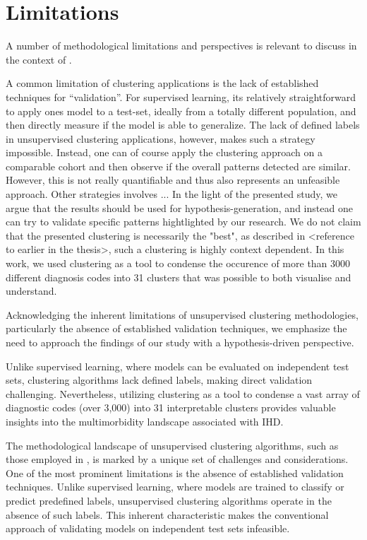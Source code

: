 \chapter{Limitations}

A number of methodological limitations and perspectives is 
relevant to discuss in the context of \studyi{}.

A common limitation of clustering applications is 
the lack of established techniques for \enquote{validation}.
For supervised learning, its relatively straightforward to 
apply ones model to a test-set, ideally from a totally different population,
and then directly measure if the model is able to generalize.
The lack of defined labels in unsupervised clustering applications, however,
makes such a strategy impossible.
Instead, one can of course apply the clustering approach on a comparable 
cohort and then observe if the overall patterns detected are similar.
However, this is not really quantifiable and thus also represents
an unfeasible approach.
Other strategies involves ...
In the light of the presented study,
we argue that the results should be used for hypothesis-generation,
and instead one can try to validate specific patterns hightlighted by our research.
We do not claim that the presented clustering is necessarily the "best",
as described in <reference to earlier in the thesis>, 
such a clustering is highly context dependent.
In this work, we used clustering as a tool to condense the occurence of more
than 3000 different diagnosis codes into 31 clusters that was possible to 
both visualise and understand.


Acknowledging the inherent limitations of unsupervised clustering
methodologies, particularly the absence of established validation techniques,
we emphasize the need to approach the findings of our study with a
hypothesis-driven perspective. 


Unlike supervised learning, where models can be
evaluated on independent test sets, clustering algorithms lack defined labels,
making direct validation challenging. Nevertheless, utilizing clustering as a
tool to condense a vast array of diagnostic codes (over 3,000) into 31
interpretable clusters provides valuable insights into the multimorbidity
landscape associated with \ac{IHD}.


The methodological landscape of unsupervised clustering algorithms, such as
those employed in \studyi{}, is marked by a unique set of challenges and
considerations. One of the most prominent limitations is the absence of
established validation techniques. Unlike supervised learning, where models are
trained to classify or predict predefined labels, unsupervised clustering
algorithms operate in the absence of such labels. This inherent characteristic
makes the conventional approach of validating models on independent test sets
infeasible.

